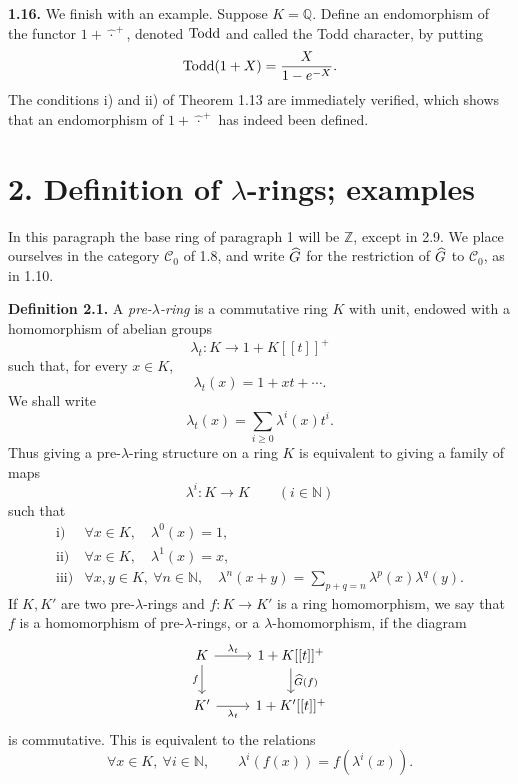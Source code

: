 \documentclass[11pt]{article}
\begin{document}
\textbf{1.16.} We finish with an example. Suppose \(K=\mathbb Q\). Define an endomorphism of the functor \(1+\widehat{\,\cdot\,}^{+}\), denoted \(\operatorname{Todd}\) and called the Todd character, by putting
\[
  \operatorname{Todd}(1+X)=\frac{X}{1-e^{-X}}.
\]
The conditions i) and ii) of Theorem 1.13 are immediately verified, which shows that an endomorphism of \(1+\widehat{\,\cdot\,}^{+}\) has indeed been defined.

\section*{2. Definition of \(\lambda\)-rings; examples}

In this paragraph the base ring of paragraph 1 will be \(\mathbb Z\), except in 2.9. We place ourselves in the category \(\mathcal C_0\) of 1.8, and write \(\widehat G\) for the restriction of \(\widehat G\) to \(\mathcal C_0\), as in 1.10.

\textbf{Definition 2.1.} A \emph{pre-\(\lambda\)-ring} is a commutative ring \(K\) with unit, endowed with a homomorphism of abelian groups
\[
  \lambda_t:K\longrightarrow 1+K[[t]]^+
\]
such that, for every \(x\in K\),
\[
  \lambda_t(x)=1+xt+\cdots.
\]
We shall write
\[
  \lambda_t(x)=\sum_{i\geq 0}\lambda^i(x)t^i.
\]
Thus giving a pre-\(\lambda\)-ring structure on a ring \(K\) is equivalent to giving a family of maps
\[
  \lambda^i:K\longrightarrow K\qquad (i\in\mathbb N)
\]
such that
\[
\begin{array}{ll}
\text{i)}&\forall x\in K,\quad \lambda^0(x)=1,\\[0.3em]
\text{ii)}&\forall x\in K,\quad \lambda^1(x)=x,\\[0.3em]
\text{iii)}&\forall x,y\in K,\ \forall n\in\mathbb N,\quad
\lambda^n(x+y)=\displaystyle\sum_{p+q=n}\lambda^p(x)\lambda^q(y).
\end{array}
\]
If \(K,K'\) are two pre-\(\lambda\)-rings and \(f:K\to K'\) is a ring homomorphism, we say that \(f\) is a homomorphism of pre-\(\lambda\)-rings, or a \(\lambda\)-homomorphism, if the diagram
\[
\begin{tikzcd}
K \arrow[r,"\lambda_t"] \arrow[d,"f"'] &
1+K[[t]]^+ \arrow[d,"\Ghat(f)"]\\
K' \arrow[r,"\lambda_t"'] &
1+K'[[t]]^+
\end{tikzcd}
\]
is commutative. This is equivalent to the relations
\[
  \forall x\in K,\ \forall i\in\mathbb N,\qquad
  \lambda^i(f(x))=f(\lambda^i(x)).
\]
\end{document}
